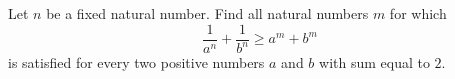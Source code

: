 Let $n$ be a fixed natural number. Find all natural numbers $ m$ for which
\[\frac{1}{a^n}+\frac{1}{b^n}\ge a^m+b^m\]
is satisfied for every two positive numbers $ a$ and $ b$ with sum equal to $2$.
